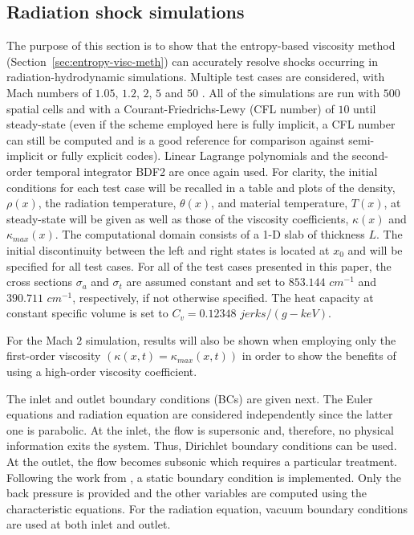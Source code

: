 \documentclass[review]{elsarticle}
\newcommand{\sect}[1]{Section~\ref{#1}}                     %
\begin{document}
\subsection{Radiation shock simulations}
\label{sec:simulations}

The purpose of this section is to show that the entropy-based viscosity method (\sect{sec:entropy-visc-meth}) can accurately resolve shocks occurring in radiation-hydrodynamic simulations. Multiple test cases are considered, with Mach numbers of $1.05$, $1.2$, $2$, $5$ and $50$ \cite{LowrieEdwards}. All of the simulations are run with $500$ spatial cells and with a Courant-Friedrichs-Lewy (CFL number) of $10$ until steady-state (even if the scheme employed here is fully implicit, a CFL number can still be computed and is a good reference for comparison against semi-implicit or fully explicit codes). Linear Lagrange polynomials and the second-order temporal integrator BDF2 are once again used. For clarity, the initial conditions for each test case will be recalled in a table and plots of the density, $\rho (x)$, the radiation temperature, $\theta (x)$, and material temperature, $T(x)$,  at steady-state will be given as well as those of the viscosity coefficients, $\kappa(x)$ and $\kappa_{max}(x)$. The computational domain consists of a 1-D slab of thickness $L$. The initial discontinuity between the left and right states is located at $x_0$ and will be specified for all test cases. For all of the test cases presented in this paper, the cross sections $\sigma_a$ and $\sigma_t$ are assumed constant and set to $853.144$ $cm^{-1}$ and $390.711$ $cm^{-1}$, respectively, if not otherwise specified. The heat capacity at constant specific volume is set to $C_v = 0.12348$ $jerks/(g-keV)$.

For the Mach $2$ simulation, results will also be shown when employing only the first-order viscosity $(\kappa(x,t) = \kappa_{max}(x,t))$ in order to show the benefits of using a high-order viscosity coefficient. 

The inlet and outlet boundary conditions (BCs) are given next. The Euler equations and radiation equation are considered independently since the latter one is parabolic. At the inlet, the flow is supersonic and, therefore, no physical information exits the system. Thus, Dirichlet boundary conditions can be used. At the outlet, the flow becomes subsonic which requires a particular treatment. Following the work from \cite{SEM}, a static boundary condition is implemented. Only the back pressure is provided and the other variables are computed using the characteristic equations. For the radiation equation, vacuum boundary conditions are used at both inlet and outlet.
\end{document}
